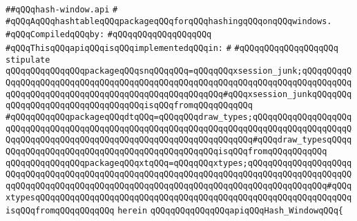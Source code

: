 \label{src/lib/x-kit/xclient/src/window/hash-window.api}
\verb|##qQQqhash-window.api|\newline
\verb|#|\newline
\verb|#qQQqAqQQqhashtableqQQqpackageqQQqforqQQqhashingqQQqonqQQqwindows.|\newline
\newline
\verb|#qQQqCompiledqQQqby:|\newline
\verb|#qQQqqQQqqQQqqQQqqQQq|\newline
\newline
\newline
\verb|#qQQqThisqQQqapiqQQqisqQQqimplementedqQQqin:|\newline
\verb|#|\newline
\verb|#qQQqqQQqqQQqqQQqqQQq|\newline
\newline
\verb|stipulate|\newline
\verb|qQQqqQQqqQQqqQQqpackageqQQqsnqQQqqQQq=qQQqqQQqxsession_junk;qQQqqQQqqQQqqQQqqQQqqQQqqQQqqQQqqQQqqQQqqQQqqQQqqQQqqQQqqQQqqQQqqQQqqQQqqQQqqQQqqQQqqQQqqQQqqQQqqQQqqQQqqQQqqQQqqQQqqQQqqQQq#qQQqxsession_junkqQQqqQQqqQQqqQQqqQQqqQQqqQQqqQQqqQQqisqQQqfromqQQqqQQqqQQq|\newline
\verb|#qQQqqQQqqQQqpackageqQQqdtqQQq=qQQqqQQqdraw_types;qQQqqQQqqQQqqQQqqQQqqQQqqQQqqQQqqQQqqQQqqQQqqQQqqQQqqQQqqQQqqQQqqQQqqQQqqQQqqQQqqQQqqQQqqQQqqQQqqQQqqQQqqQQqqQQqqQQqqQQqqQQqqQQqqQQqqQQqqQQq#qQQqdraw_typesqQQqqQQqqQQqqQQqqQQqqQQqqQQqqQQqqQQqqQQqqQQqqQQqisqQQqfromqQQqqQQqqQQq|\newline
\verb|qQQqqQQqqQQqqQQqpackageqQQqxtqQQq=qQQqqQQqxtypes;qQQqqQQqqQQqqQQqqQQqqQQqqQQqqQQqqQQqqQQqqQQqqQQqqQQqqQQqqQQqqQQqqQQqqQQqqQQqqQQqqQQqqQQqqQQqqQQqqQQqqQQqqQQqqQQqqQQqqQQqqQQqqQQqqQQqqQQqqQQqqQQqqQQqqQQqqQQq#qQQqxtypesqQQqqQQqqQQqqQQqqQQqqQQqqQQqqQQqqQQqqQQqqQQqqQQqqQQqqQQqqQQqqQQqisqQQqfromqQQqqQQqqQQq|\newline
\verb|herein|\newline
\verb|qQQqqQQqqQQqqQQqapiqQQqHash_WindowqQQq{|\newline
